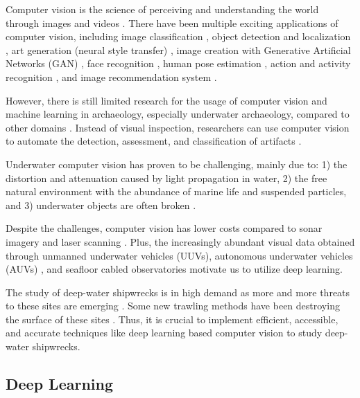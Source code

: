 \documentclass[a4paper, 11pt, oneside]{article}
\begin{document}
\label{sec:cvForUnderwater}

Computer vision is the science of perceiving and understanding the world through images and videos \cite{elgendy2020deep}.
There have been multiple exciting applications of computer vision, including image classification \cite{rawat2017deep},
object detection and localization \cite{zhao2019object,liu2020deep}, art generation (neural style transfer)
\cite{jing2019neural}, image creation with Generative Artificial Networks (GAN) \cite{goodfellow2014generative},
face recognition \cite{parkhi2015deep}, human pose estimation \cite{toshev2014deeppose}, action and activity recognition
\cite{poppe2010survey}, and image recommendation system \cite{niu2018neural}.

However, there is still limited research for the usage of computer vision and machine learning in archaeology,
especially underwater archaeology, compared to other domains \cite{maaten2007computer, qin2015underwater}.
Instead of visual inspection, researchers can use computer vision to automate the detection, assessment, and classification
of artifacts \cite{maaten2007computer}.

Underwater computer vision has proven to be challenging, mainly due to: 1) the distortion and attenuation caused by
light propagation in water, 2) the free natural environment with the abundance of marine life and suspended
particles, and 3) underwater objects are often broken
\cite{qin2015underwater, rizzini2015investigation, lu2017underwater, mccarthy20193d}.

Despite the challenges, computer vision has lower costs \cite{rizzini2015investigation} compared to sonar imagery
\cite{abu2019statistically} and laser scanning \cite{gordon1992use}. Plus, the increasingly abundant visual data obtained
through unmanned underwater vehicles (UUVs), autonomous underwater vehicles (AUVs)
\cite{lu2017underwater, moniruzzaman2017deep}, and seafloor cabled observatories \cite{qin2015underwater} motivate us
to utilize deep learning.

The study of deep-water shipwrecks is in high demand as more and more threats to these sites are emerging
\cite{drap2015underwater}. Some new trawling methods have been destroying the surface of these sites \cite{drap2015underwater}.
Thus, it is crucial to implement efficient, accessible, and accurate techniques like deep learning based computer vision
to study deep-water shipwrecks.

\subsection{Deep Learning}
\end{document}
